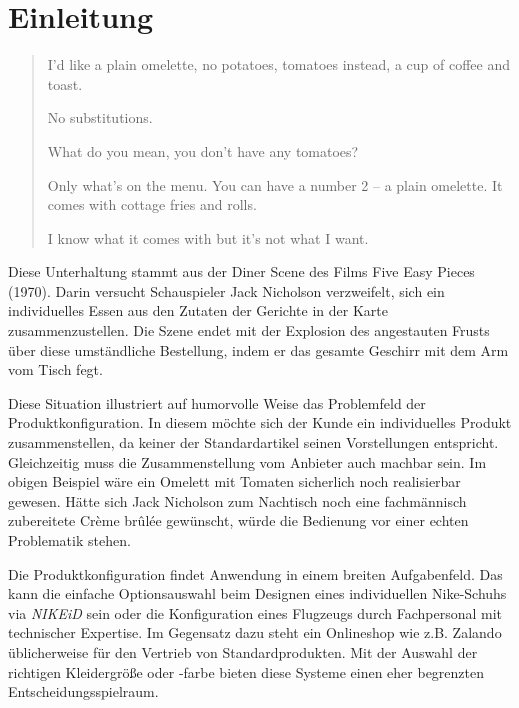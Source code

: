 \documentclass[11pt, a4paper, titlepage, listof=totoc, bibliography=totoc, index=totoc, twoside, openright, headings=normal]{scrreprt}
\begin{document}






%





\chapter{Einleitung}
\begin{quote}
\glqq I'd like a plain omelette, no potatoes, tomatoes instead, a cup of coffee and toast.\grqq{}
\begin{addmargin}[25pt]{0pt} 
\glqq No substitutions.\grqq{}
\end{addmargin}
\glqq What do you mean, you don't have any tomatoes?\grqq{}
\begin{addmargin}[25pt]{0pt} 
\glqq Only what's on the menu. You can have a number 2 -- a plain omelette. It comes with cottage fries and rolls.\grqq{}
\end{addmargin}
\glqq I know what it comes with but it's not what I want.\grqq{}
\end{quote}
Diese Unterhaltung stammt aus der \glqq Diner Scene\grqq{} des Films \glqq Five Easy Pieces\grqq{} (1970). Darin versucht Schauspieler Jack Nicholson verzweifelt, sich ein individuelles Essen aus den Zutaten der Gerichte in der Karte zusammenzustellen. Die Szene endet mit der Explosion des angestauten Frusts über diese umständliche Bestellung, indem er das gesamte Geschirr mit dem Arm vom Tisch fegt.

Diese Situation illustriert auf humorvolle Weise das Problemfeld der Produktkonfiguration. In diesem möchte sich der Kunde ein individuelles Produkt zusammenstellen, da keiner der Standardartikel seinen Vorstellungen entspricht. Gleichzeitig muss die Zusammenstellung vom Anbieter auch machbar sein. Im obigen Beispiel wäre ein Omelett mit Tomaten sicherlich noch realisierbar gewesen. Hätte sich Jack Nicholson zum Nachtisch noch eine fachmännisch zubereitete Crème brûlée gewünscht, würde die Bedienung vor einer echten Problematik stehen.

Die Produktkonfiguration findet Anwendung in einem breiten Aufgabenfeld. Das kann die einfache Optionsauswahl beim Designen eines individuellen Nike-Schuhs via \emph{NIKEiD} sein oder die Konfiguration eines Flugzeugs durch Fachpersonal mit technischer Expertise. Im Gegensatz dazu steht ein Onlineshop wie z.B. Zalando üblicherweise für den Vertrieb von Standardprodukten. Mit der Auswahl der richtigen Kleidergröße oder -farbe bieten diese Systeme einen eher begrenzten Entscheidungsspielraum.
\end{document}
